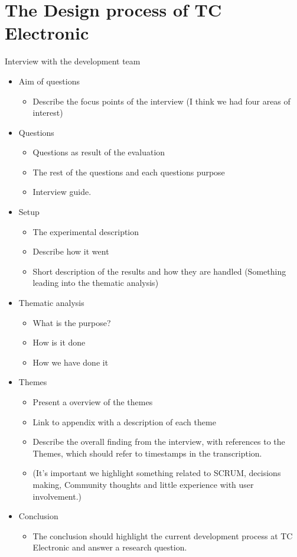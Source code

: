 \chapter{The Design process of TC Electronic}
\label{Interview}
\begin{LARGE}
Interview with the development team
\end{LARGE}

\begin{itemize}
	\item Aim of questions
		\begin{itemize}
			\item Describe the focus points of the interview (I think we had four areas of interest)
		\end{itemize}
	\item Questions
		\begin{itemize}
			\item Questions as result of the evaluation
			\item The rest of the questions and each questions purpose
			\item Interview guide.
		\end{itemize}
	\item Setup
		\begin{itemize}
			\item The experimental description
			\item Describe how it went
			\item Short description of the results and how they are handled (Something leading into the thematic analysis)
		\end{itemize}
	\item Thematic analysis
		\begin{itemize}
			\item What is the purpose?
			\item How is it done
			\item How we have done it
		\end{itemize}
	\item Themes
		\begin{itemize}
			\item Present a overview of the themes
			\item Link to appendix with a description of each theme
			\item Describe the overall finding from the interview, with references to the Themes, which should refer to timestamps in the transcription.
			\item (It’s important we highlight something related to SCRUM, decisions making, Community thoughts and little experience with user involvement.)
		\end{itemize}
	\item Conclusion
		\begin{itemize}
			\item The conclusion should highlight the current development process at TC Electronic and answer a research question.
		\end{itemize}
\end{itemize}

